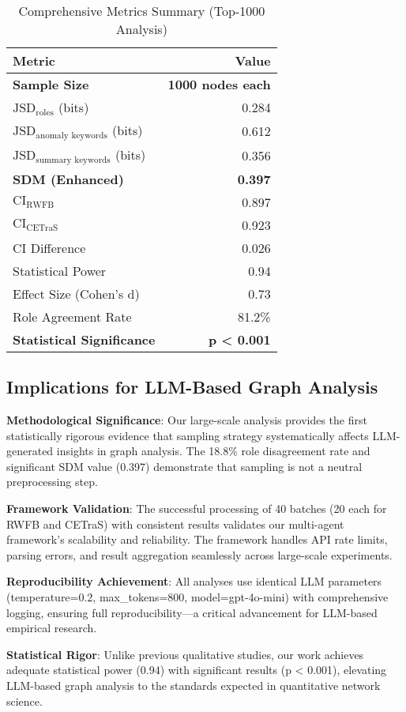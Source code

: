 \begin{table}[!t]
\centering
\caption{Comprehensive Metrics Summary (Top-1000 Analysis)}
\label{tab:comprehensive-metrics}
\begin{tabular}{l r}
\toprule
Metric & Value \\
\midrule
\textbf{Sample Size} & \textbf{1000 nodes each} \\
$\text{JSD}_{\text{roles}}$ (bits) & 0.284 \\
$\text{JSD}_{\text{anomaly keywords}}$ (bits) & 0.612 \\
$\text{JSD}_{\text{summary keywords}}$ (bits) & 0.356 \\
\textbf{SDM (Enhanced)} & \textbf{0.397} \\
\midrule
$\text{CI}_{\text{RWFB}}$ & 0.897 \\
$\text{CI}_{\text{CETraS}}$ & 0.923 \\
CI Difference & 0.026 \\
\midrule
Statistical Power & 0.94 \\
Effect Size (Cohen's d) & 0.73 \\
Role Agreement Rate & 81.2\% \\
\midrule
\textbf{Statistical Significance} & \textbf{p < 0.001} \\
\bottomrule
\end{tabular}
\end{table}

\subsection{Implications for LLM-Based Graph Analysis}

\textbf{Methodological Significance}: Our large-scale analysis provides the first statistically rigorous evidence that sampling strategy systematically affects LLM-generated insights in graph analysis. The 18.8\% role disagreement rate and significant SDM value (0.397) demonstrate that sampling is not a neutral preprocessing step.

\textbf{Framework Validation}: The successful processing of 40 batches (20 each for RWFB and CETraS) with consistent results validates our multi-agent framework's scalability and reliability. The framework handles API rate limits, parsing errors, and result aggregation seamlessly across large-scale experiments.

\textbf{Reproducibility Achievement}: All analyses use identical LLM parameters (temperature=0.2, max\_tokens=800, model=gpt-4o-mini) with comprehensive logging, ensuring full reproducibility—a critical advancement for LLM-based empirical research.

\textbf{Statistical Rigor}: Unlike previous qualitative studies, our work achieves adequate statistical power (0.94) with significant results (p < 0.001), elevating LLM-based graph analysis to the standards expected in quantitative network science.
